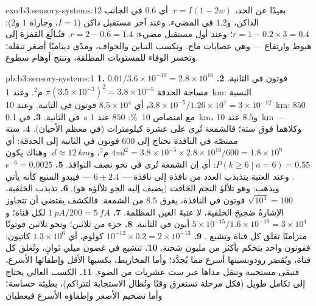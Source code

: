 \begin{solution}{exo:b3:sensory-systems:12}
بعيدًا عن الحد، $r = I(1 - 2w)$: أي $0.6$ في الجانب الداكن،
و$1.2$ في المضيء. وعند آخر مستقبل داكن ($I = 1$، وجاراه $1$
و$2$): $r
= 1 - 0.2\times 3 = 0.4$؛ وعند أول مستقبل مضيء: $r = 2 - 0.6 = 1.4$.
فتُبالَغ القفزة إلى هبوط وارتفاع --- وهي عصابات ماخ. وتكسب
 التباين والحواف، ومدًى ديناميًا أصغر تنقله؛ وتخسر
الوفاء للمستويات المطلقة، وتنتج أوهام سطوع.
\end{solution}

\begin{solution}{pb:b3:sensory-systems:1}
\textbf{1.} $0.01/3.6\times 10^{-19} = 2.8\times 10^{16}$ فوتون في
الثانية.
\textbf{2.} مساحة الحدقة $\pi(3.5\times 10^{-3})^{2} = 3.8\times 10^{-5}$
م$^{2}$. وعند \qty{1}{km}: النسبة $3.8\times 10^{-5}/1.26\times 10^{7} =
3\times 10^{-12}$، أي $8.5\times 10^{4}$ فوتون في الثانية. وعند \qty{10}{km}:
$850$ في الثانية.
\textbf{3.} في \qty{0.1}{s} مع امتصاص \qty{10}{\%}: $850$ عند
\qty{1}{km}، و$8.5$ عند \qty{10}{km} --- وكلاهما فوق ستة؛
فالشمعة تُرى على عشرة كيلومترات (في معظم الأحيان).
\textbf{4.} ستة ممتصّة في النافذة تحتاج إلى $600$ فوتون في
الثانية إلى الحدقة: أي $4\pi d^{2} = 3.8\times 10^{-5}\times 2.8\times 10^{16}/600
= 1.8\times 10^{9}$ م$^{2}$، و$d \approx \qty{12}{km}$. وهناك يكون $P(k \ge
6 \mid a = 6) = 0.55$: أي إن الشمعة تُرى في نحو نصف النوافذ.
\textbf{5.} $e^{-6} = 0.0025$. وعند العتبة يتذبذب العدد من
نافذة إلى نافذة --- $6 \pm 2.4$ --- فيبدو المنبع كأنه يأتي
ويذهب: وهو تلألؤ النجم الخافت (يضيف إليه الجو تلألؤه هو).
\textbf{6.} تذبذب الخلفية، $\sqrt{10^{4}} = 100$ فوتون في
النافذة، يغرق $8.5$ من الشمعة: فالكشف يقتضي أن تتجاوز
الإشارةُ ضجيجَ الخلفية، لا عتبةَ العين المظلمة.
\textbf{7.} $\qty{1}{pA}/200 = \qty{5}{fA}$ لكل قناة؛ و$5\times
10^{-15}/1.6\times 10^{-19} = 3\times 10^{4}$ أيون في الثانية.
\textbf{8.} جزء من ثلاثين؛ ونحو ثلاثين فوتونًا متزامنًا تغلق
كل قناة وتشبع .
\textbf{9.} $10^{-12}\times 0.2 = 2\times 10^{-13}$ كولوم، أي $1.3\times 10^{6}$
كاتيون: ففوتون واحد يتحكم بأكثر من مليون شحنة.
\textbf{10.} تتشبع  في غضون ميلي ثوانٍ، وتُغلق كل
قناة، ويُقصَر رودوبسينها أسرع مما يُجدَّد؛ وأما المخاريط،
بكسبها الأقل وإطفائها الأسرع، فتبقى مستجيبة وتنقل مداها عبر
ست عشريات من الضوء.
\textbf{11.} الكسب العالي يحتاج إلى تكامل طويل (فكل مرحلة
تستغرق وقتًا وتُطال الاستجابة لتتراكم)،  بطيئة
حساسة؛ وأما تضخيم  الأصغر وإطفاؤه الأسرع فيعطيان

\end{solution}
